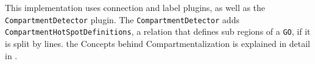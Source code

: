 This implementation uses connection and label plugins, as well as the \texttt{CompartmentDetector} plugin. The \texttt{CompartmentDetector} adds \texttt{CompartmentHotSpotDefinitions}, a relation that defines sub regions of a \texttt{GO}, if it is split by lines. the Concepts behind Compartmentalization is explained in detail in \cite{nachreiner_couchedit_2020}.

